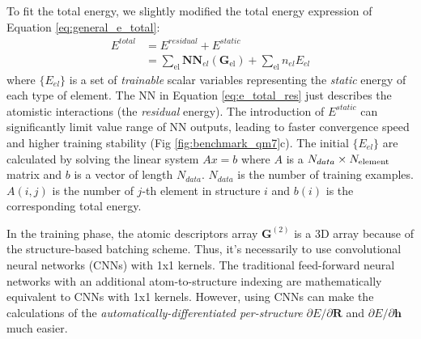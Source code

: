 \documentclass[preprint]{revtex4-2}
\begin{document}
To fit the total energy, we slightly modified the total energy expression of 
Equation \ref{eq:general_e_total}:
\begin{align}
\label{eq:e_total_res}
E^{total} & = E^{residual} + E^{static} \nonumber \\
& = \sum_{\mathrm{el}}{\mathbf{NN}_{el}\left(\mathbf{G}_{\mathrm{el}}\right)}
+ \sum_{\mathrm{el}}{n_{el}E_{el}}
\end{align}
where $\{E_{el}\}$ is a set of \textit{trainable} scalar variables representing 
the \textit{static} energy of each type of element\cite{kCON}. The NN in 
Equation \ref{eq:e_total_res} just describes the atomistic interactions 
(the \textit{residual} energy). 
The introduction of $E^{static}$ can significantly limit value range of NN 
outputs, leading to faster convergence speed and higher training stability 
(Fig \ref{fig:benchmark_qm7}c). The initial $\{E_{el}\}$ are calculated by 
solving the linear system $Ax=b$ where $A$ is a $N_{data} \times N_{\mathrm{element}}$ matrix 
and $b$ is a vector of length $N_{data}$. $N_{data}$ is the number of training 
examples. $A(i,j)$ is the number of $j$-th element in structure $i$ and $b(i)$ 
is the corresponding total energy.

In the training phase, the atomic descriptors array $\mathbf{G}^{(2)}$ is a 3D 
array because of the structure-based batching scheme. Thus, it's necessarily to 
use convolutional neural networks (CNNs) with 1x1 kernels\cite{kCON}. 
The traditional feed-forward neural networks with an additional 
atom-to-structure indexing\cite{Behler,ANI,TensorMol,DeePMD,BIMNN} are 
mathematically equivalent to CNNs with 1x1 kernels. However, using CNNs can make
the calculations of the \textit{automatically-differentiated per-structure} 
$\partial E/\partial \mathbf{R}$ and $\partial E/\partial \mathbf{h}$ much 
easier.
\end{document}
